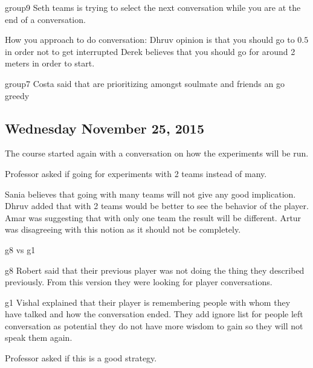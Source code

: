 group9
Seth teams is trying to select the next conversation while you are at the end of a conversation.

How you approach to do conversation:
Dhruv opinion is that you should go to $0.5$ in order not to get interrupted 
Derek believes that you should go for around 2 meters in order to start.

group7
Costa said that are prioritizing amongst soulmate and friends an go greedy
\subsection{Wednesday November 25, 2015}
The course started again with a conversation on how the experiments will be run.
 

Professor asked if going for experiments with 2 teams instead of many.
 

Sania believes that going with many teams will not give any good implication.
Dhruv added that with 2 teams would be better to see the behavior of the player.
Amar was suggesting that with only one team the result will be different.
Artur was disagreeing with this notion as it should not be completely.

g8 vs g1

g8
Robert said that their previous player was not doing the thing they described previously. From this version they were looking for player conversations.

g1
Vishal explained that their player is remembering people with whom they have talked and how the conversation ended. They add ignore list for people left conversation as potential they do not have more wisdom to gain so they will not speak them again.

Professor asked if this is a good strategy.

